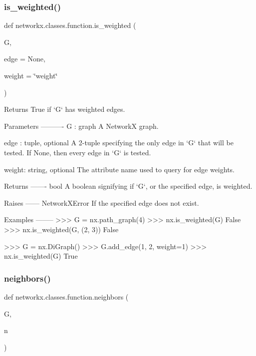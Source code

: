 \subsubsection{\texorpdfstring{is\+\_\+weighted()}{is\_weighted()}}
{\footnotesize\ttfamily def networkx.\+classes.\+function.\+is\+\_\+weighted (\begin{DoxyParamCaption}\item[{}]{G,  }\item[{}]{edge = {\ttfamily None},  }\item[{}]{weight = {\ttfamily \char`\"{}weight\char`\"{}} }\end{DoxyParamCaption})}

\begin{DoxyVerb}Returns True if `G` has weighted edges.

Parameters
----------
G : graph
    A NetworkX graph.

edge : tuple, optional
    A 2-tuple specifying the only edge in `G` that will be tested. If
    None, then every edge in `G` is tested.

weight: string, optional
    The attribute name used to query for edge weights.

Returns
-------
bool
    A boolean signifying if `G`, or the specified edge, is weighted.

Raises
------
NetworkXError
    If the specified edge does not exist.

Examples
--------
>>> G = nx.path_graph(4)
>>> nx.is_weighted(G)
False
>>> nx.is_weighted(G, (2, 3))
False

>>> G = nx.DiGraph()
>>> G.add_edge(1, 2, weight=1)
>>> nx.is_weighted(G)
True\end{DoxyVerb}
 \mbox{\label{namespacenetworkx_1_1classes_1_1function_a271a8668c32a4a881230a7814dcc4ec4}} 
\subsubsection{\texorpdfstring{neighbors()}{neighbors()}}
{\footnotesize\ttfamily def networkx.\+classes.\+function.\+neighbors (\begin{DoxyParamCaption}\item[{}]{G,  }\item[{}]{n }\end{DoxyParamCaption})}

